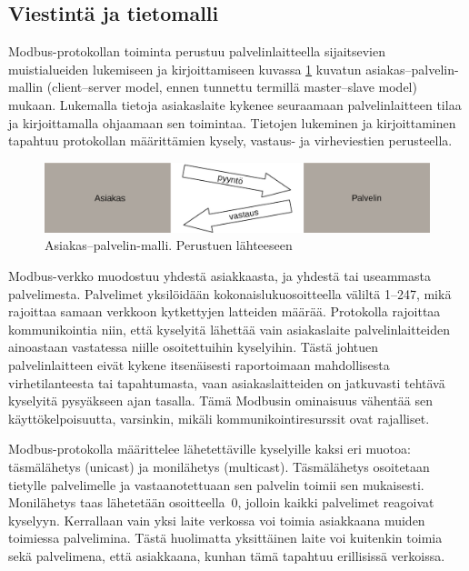   \subsection{Viestintä ja tietomalli}

  Modbus-protokollan toiminta perustuu palvelinlaitteella sijaitsevien muistialueiden lukemiseen ja kirjoittamiseen kuvassa \ref{fig:c_s} kuvatun asiakas--palvelin-mallin (client--server model, ennen tunnettu termillä master--slave model) mukaan.  Lukemalla tietoja asiakaslaite kykenee seuraamaan palvelinlaitteen tilaa ja kirjoittamalla ohjaamaan sen toimintaa. Tietojen lukeminen ja kirjoittaminen tapahtuu protokollan määrittämien kysely, vastaus- ja virheviestien perusteella. \parencite{modbusAppSpec}

  \begin{figure}[h]
    \centering
    \includegraphics[width=1\textwidth]{figures/client_server}
    \caption[Asiakas--palvelin-malli]{Asiakas--palvelin-malli.  Perustuen lähteeseen \parencite{modbusAppSpec}}
    \label{fig:c_s}
  \end{figure}

  Modbus-verkko muodostuu yhdestä asiakkaasta, ja yhdestä tai useammasta palvelimesta. Palvelimet yksilöidään kokonaislukuosoitteella väliltä 1--247, mikä rajoittaa samaan verkkoon kytkettyjen latteiden määrää.  Protokolla rajoittaa kommunikointia niin, että kyselyitä lähettää vain asiakaslaite palvelinlaitteiden ainoastaan vastatessa niille osoitettuihin kyselyihin. \parencite{modbusSerialSpec} Tästä johtuen palvelinlaitteen eivät kykene itsenäisesti raportoimaan mahdollisesta virhetilanteesta tai tapahtumasta, vaan asiakaslaitteiden on jatkuvasti tehtävä kyselyitä pysyäkseen ajan tasalla. Tämä Modbusin ominaisuus vähentää sen käyttökelpoisuutta, varsinkin, mikäli kommunikointiresurssit ovat rajalliset.

  Modbus-protokolla määrittelee lähetettäville kyselyille kaksi eri muotoa: täsmälähetys (unicast) ja monilähetys (multicast). Täsmälähetys osoitetaan tietylle palvelimelle ja vastaanotettuaan sen palvelin toimii sen mukaisesti. Monilähetys taas lähetetään osoitteella~0, jolloin kaikki palvelimet reagoivat kyselyyn. \parencite{modbusSerialSpec} Kerrallaan vain yksi laite verkossa voi toimia asiakkaana muiden toimiessa palvelimina. Tästä huolimatta yksittäinen laite voi kuitenkin toimia sekä palvelimena, että asiakkaana, kunhan tämä tapahtuu erillisissä verkoissa. \parencite{DincerRosen}

